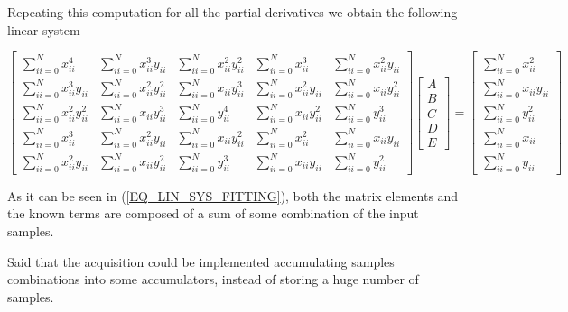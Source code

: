 \documentclass[main]{subfiles}
\begin{document}
Repeating this computation for all the partial derivatives we obtain the following 
linear system

\begin{equation} 
    \begin{bmatrix}
        \sum_{ii=0}^{N} x_{ii}^4 & \sum_{ii=0}^{N} x_{ii}^3y_{ii} & \sum_{ii=0}^{N} x_{ii}^2y_{ii}^2 & \sum_{ii=0}^{N} x_{ii}^3 & \sum_{ii=0}^{N} x_{ii}^2y_{ii} \\
        \sum_{ii=0}^{N} x_{ii}^3y_{ii} & \sum_{ii=0}^{N} x_{ii}^2y_{ii}^2 & \sum_{ii=0}^{N} x_{ii}y_{ii}^3 & \sum_{ii=0}^{N} x_{ii}^2y_{ii} & \sum_{ii=0}^{N} x_{ii}y_{ii}^2 \\
        \sum_{ii=0}^{N} x_{ii}^2y_{ii}^2 & \sum_{ii=0}^{N} x_{ii}y_{ii}^3 & \sum_{ii=0}^{N} y_{ii}^4 & \sum_{ii=0}^{N} x_{ii}y_{ii}^2 & \sum_{ii=0}^{N} y_{ii}^3 \\
        \sum_{ii=0}^{N} x_{ii}^3 & \sum_{ii=0}^{N} x_{ii}^2y_{ii} & \sum_{ii=0}^{N} x_{ii}y_{ii}^2 & \sum_{ii=0}^{N} x_{ii}^2 & \sum_{ii=0}^{N} x_{ii}y_{ii} \\
        \sum_{ii=0}^{N} x_{ii}^2y_{ii} & \sum_{ii=0}^{N} x_{ii}y_{ii}^2 & \sum_{ii=0}^{N} y_{ii}^3 & \sum_{ii=0}^{N} x_{ii}y_{ii} & \sum_{ii=0}^{N} y_{ii}^2
    \end{bmatrix}
    \begin{bmatrix}
        A\\
        B\\
        C\\
        D\\
        E
    \end{bmatrix} = 
    \begin{bmatrix}
        \sum_{ii=0}^{N} x_{ii}^2\\
        \sum_{ii=0}^{N} x_{ii}y_{ii}\\
        \sum_{ii=0}^{N} y_{ii}^2\\
        \sum_{ii=0}^{N} x_{ii}\\
        \sum_{ii=0}^{N} y_{ii}
    \end{bmatrix}
    \label{EQ_LIN_SYS_FITTING}
\end{equation}

As it can be seen in (\ref{EQ_LIN_SYS_FITTING}), both the matrix elements and the 
known terms are composed of a sum of some combination of the input samples.

Said that the acquisition could be implemented accumulating samples combinations 
into some accumulators, instead of storing a huge number of samples.
\end{document}
